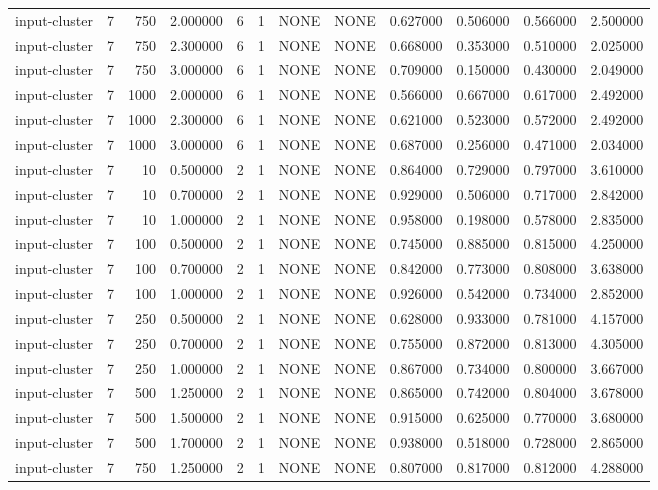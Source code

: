 \begin{tabular}{lrrrllllrrrr}
input-cluster & 7 & 750 & 2.000000 & 6 & 1 & NONE & NONE & 0.627000 & 0.506000 & 0.566000 & 2.500000 \\
input-cluster & 7 & 750 & 2.300000 & 6 & 1 & NONE & NONE & 0.668000 & 0.353000 & 0.510000 & 2.025000 \\
input-cluster & 7 & 750 & 3.000000 & 6 & 1 & NONE & NONE & 0.709000 & 0.150000 & 0.430000 & 2.049000 \\
input-cluster & 7 & 1000 & 2.000000 & 6 & 1 & NONE & NONE & 0.566000 & 0.667000 & 0.617000 & 2.492000 \\
input-cluster & 7 & 1000 & 2.300000 & 6 & 1 & NONE & NONE & 0.621000 & 0.523000 & 0.572000 & 2.492000 \\
input-cluster & 7 & 1000 & 3.000000 & 6 & 1 & NONE & NONE & 0.687000 & 0.256000 & 0.471000 & 2.034000 \\
input-cluster & 7 & 10 & 0.500000 & 2 & 1 & NONE & NONE & 0.864000 & 0.729000 & 0.797000 & 3.610000 \\
input-cluster & 7 & 10 & 0.700000 & 2 & 1 & NONE & NONE & 0.929000 & 0.506000 & 0.717000 & 2.842000 \\
input-cluster & 7 & 10 & 1.000000 & 2 & 1 & NONE & NONE & 0.958000 & 0.198000 & 0.578000 & 2.835000 \\
input-cluster & 7 & 100 & 0.500000 & 2 & 1 & NONE & NONE & 0.745000 & 0.885000 & 0.815000 & 4.250000 \\
input-cluster & 7 & 100 & 0.700000 & 2 & 1 & NONE & NONE & 0.842000 & 0.773000 & 0.808000 & 3.638000 \\
input-cluster & 7 & 100 & 1.000000 & 2 & 1 & NONE & NONE & 0.926000 & 0.542000 & 0.734000 & 2.852000 \\
input-cluster & 7 & 250 & 0.500000 & 2 & 1 & NONE & NONE & 0.628000 & 0.933000 & 0.781000 & 4.157000 \\
input-cluster & 7 & 250 & 0.700000 & 2 & 1 & NONE & NONE & 0.755000 & 0.872000 & 0.813000 & 4.305000 \\
input-cluster & 7 & 250 & 1.000000 & 2 & 1 & NONE & NONE & 0.867000 & 0.734000 & 0.800000 & 3.667000 \\
input-cluster & 7 & 500 & 1.250000 & 2 & 1 & NONE & NONE & 0.865000 & 0.742000 & 0.804000 & 3.678000 \\
input-cluster & 7 & 500 & 1.500000 & 2 & 1 & NONE & NONE & 0.915000 & 0.625000 & 0.770000 & 3.680000 \\
input-cluster & 7 & 500 & 1.700000 & 2 & 1 & NONE & NONE & 0.938000 & 0.518000 & 0.728000 & 2.865000 \\
input-cluster & 7 & 750 & 1.250000 & 2 & 1 & NONE & NONE & 0.807000 & 0.817000 & 0.812000 & 4.288000 \\

\end{tabular}
